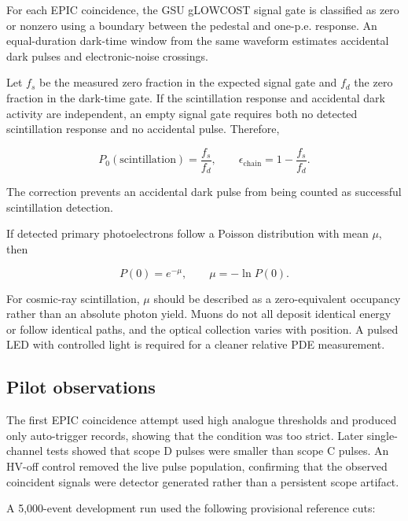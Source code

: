 For each EPIC coincidence, the GSU gLOWCOST signal gate is classified as zero or nonzero using a boundary between the pedestal and one-p.e. response. An equal-duration dark-time window from the same waveform estimates accidental dark pulses and electronic-noise crossings.

Let $f_s$ be the measured zero fraction in the expected signal gate and $f_d$ the zero fraction in the dark-time gate. If the scintillation response and accidental dark activity are independent, an empty signal gate requires both no detected scintillation response and no accidental pulse. Therefore,

\begin{equation}
  P_0(\text{scintillation})=\frac{f_s}{f_d},
  \qquad
  \epsilon_{\mathrm{chain}}=1-\frac{f_s}{f_d}.
  \label{eq:zero-efficiency}
\end{equation}

The correction prevents an accidental dark pulse from being counted as successful scintillation detection.

If detected primary photoelectrons follow a Poisson distribution with mean $\mu$, then

\begin{equation}
  P(0)=e^{-\mu},
  \qquad
  \mu=-\ln P(0).
  \label{eq:zero-poisson}
\end{equation}

For cosmic-ray scintillation, $\mu$ should be described as a zero-equivalent occupancy rather than an absolute photon yield. Muons do not all deposit identical energy or follow identical paths, and the optical collection varies with position. A pulsed LED with controlled light is required for a cleaner relative PDE measurement.

\subsection{Pilot observations}

The first EPIC coincidence attempt used high analogue thresholds and produced only auto-trigger records, showing that the condition was too strict. Later single-channel tests showed that scope D pulses were smaller than scope C pulses. An HV-off control removed the live pulse population, confirming that the observed coincident signals were detector generated rather than a persistent scope artifact.

A 5,000-event development run used the following provisional reference cuts:

